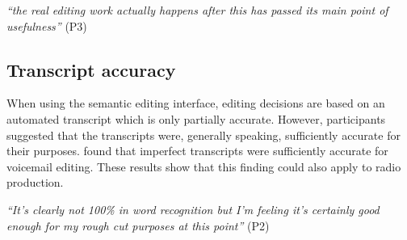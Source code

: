 \textit{``the real editing work actually happens after this has passed its main point of usefulness''} (P3)











\subsection{Transcript accuracy}
When using the semantic editing interface, editing decisions are based on an automated transcript which is only
partially accurate. However, participants suggested that the transcripts were, generally speaking, sufficiently
accurate for their purposes.  \citet{Whittaker2004} found that imperfect transcripts were sufficiently accurate for
voicemail editing. These results show that this finding could also apply to radio production.

\textit{``It's clearly not 100\% in word recognition but I'm feeling it's certainly good enough for my rough cut
  purposes at this point''} (P2)

